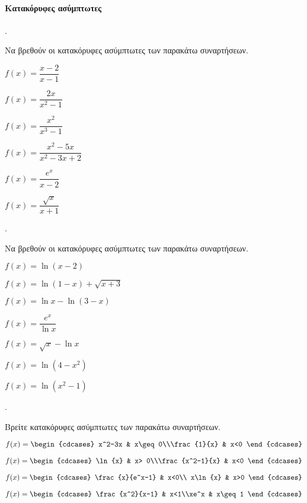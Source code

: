 \documentclass[11pt,a4paper,twocolumn]{article}
\newcounter{askhsh}
\newcommand{\askhsh}{\large\theaskhsh.\ \addtocounter{askhsh}{1}}
\begin{document}
\paragraph{Κατακόρυφες ασύμπτωτες}
\askhsh Να βρεθούν οι κατακόρυφες ασύμπτωτες των παρακάτω συναρτήσεων.
\begin{multicols}{2}
\begin{alist}
\item $f(x)=\dfrac{x-2}{x-1}$
\item $f(x)=\dfrac{2x}{x^2-1}$
\item $f(x)=\dfrac{x^2}{x^3-1}$
\item $f(x)=\dfrac{x^2-5x}{x^2-3x+2}$
\item $f(x)=\dfrac{e^x}{x-2}$
\item $f(x)=\dfrac{\sqrt{x}}{x+1}$
\end{alist}
\end{multicols}
\askhsh Να βρεθούν οι κατακόρυφες ασύμπτωτες των παρακάτω συναρτήσεων.
\begin{alist}
\item $f(x)=\ln{(x-2)}$
\item $f(x)=\ln{(1-x)}+\sqrt{x+3}$
\item $f(x)=\ln{x}-\ln{(3-x)}$
\begin{multicols}{2}
\item $f(x)=\dfrac{e^x}{\ln{x}}$
\item $f(x)=\sqrt{x}-\ln{x}$
\item $f(x)=\ln{\left(4-x^2\right)}$
\item $f(x)=\ln{\left(x^2-1\right)}$
\end{multicols}
\end{alist}
\askhsh Βρείτε κατακόρυφες ασύμπτωτες των παρακάτω συναρτήσεων.
\begin{alist}
\item $f(x)=\begin{cdcases}
x^2-3x & x\geq 0\\\frac{1}{x} & x<0
\end{cdcases}$
\item $f(x)=\begin{cdcases}
\ln{x} & x> 0\\\frac{x^2-1}{x} & x<0
\end{cdcases}$
\item $f(x)=\begin{cdcases}
\frac{x}{e^x-1} & x<0\\ x\ln{x} & x>0
\end{cdcases}$
\item $f(x)=\begin{cdcases}
\frac{x^2}{x-1} & x<1\\xe^x & x\geq1
\end{cdcases}$
\end{alist}
\end{document}
